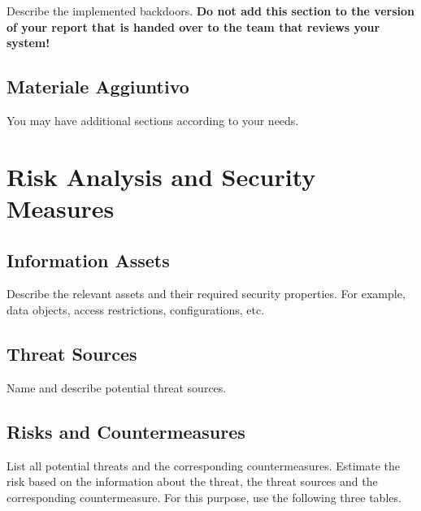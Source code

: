 \documentclass{article}
\begin{document}
Describe the implemented backdoors. {\bfseries Do not add
    this section to the version of your report that is handed over to
    the team that reviews your system!}

\subsection{Materiale Aggiuntivo}

You may have additional sections according to your needs.


\section{Risk Analysis and Security Measures}

\subsection{Information Assets}

Describe the relevant assets and their required security
  properties. For example, data objects, access restrictions,
  configurations, etc.

\subsection{Threat Sources}

Name and describe potential threat sources.

\subsection{Risks and Countermeasures}

List all potential threats and the
  corresponding countermeasures. Estimate the risk based on 
  the information about the threat, the threat sources and the 
  corresponding countermeasure. For this purpose, use the following three
  tables.

\end{document}
